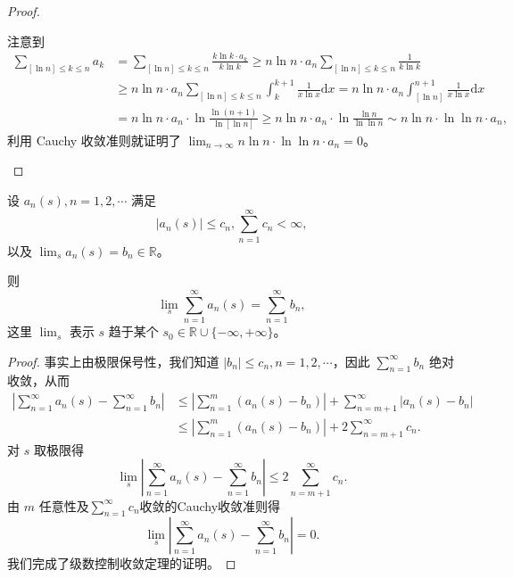 \documentclass[../../main.tex]{subfiles}
\begin{document}
\begin{proof}
\begin{enumerate}
注意到
\begin{align*}
\sum_{[\ln n] \leqslant k \leqslant n} a_k &= \sum_{[\ln n] \leqslant k \leqslant n} \frac{k \ln k \cdot a_k}{k \ln k} \geqslant n \ln n \cdot a_n \sum_{[\ln n] \leqslant k \leqslant n} \frac{1}{k \ln k} \\
&\geqslant n \ln n \cdot a_n \sum_{[\ln n] \leqslant k \leqslant n} \int_{k}^{k + 1} \frac{1}{x \ln x} \mathrm{d}x = n \ln n \cdot a_n \int_{[\ln n]}^{n + 1} \frac{1}{x \ln x} \mathrm{d}x \\
&= n \ln n \cdot a_n \cdot \ln \frac{\ln (n + 1)}{\ln [\ln n]} \geqslant n \ln n \cdot a_n \cdot \ln \frac{\ln n}{\ln \ln n} \sim n \ln n \cdot \ln \ln n \cdot a_n,
\end{align*}
利用 Cauchy 收敛准则就证明了 \( \lim_{n \to \infty} n \ln n \cdot \ln \ln n \cdot a_n = 0 \)。
\end{enumerate}
\end{proof}

\begin{theorem}[级数的控制收敛定理]\label{theorem:级数的控制收敛定理}
设 \( a_n(s), n = 1, 2, \cdots \) 满足
\[
|a_n(s)| \leqslant c_n, \sum_{n = 1}^{\infty} c_n < \infty,
\]
以及 \( \lim_{s} a_n(s) = b_n \in \mathbb{R} \)。

则
\[
\lim_{s} \sum_{n = 1}^{\infty} a_n(s) = \sum_{n = 1}^{\infty} b_n,
\]
这里 \( \lim_{s} \) 表示 \( s \) 趋于某个 \( s_0 \in \mathbb{R} \cup \{-\infty, +\infty\} \)。
\end{theorem}
\begin{proof}
事实上由极限保号性，我们知道 \( |b_n| \leqslant c_n, n = 1, 2, \cdots \)，因此 \( \sum_{n = 1}^{\infty} b_n \) 绝对收敛，从而
\begin{align*}
\left| \sum_{n = 1}^{\infty} a_n(s) - \sum_{n = 1}^{\infty} b_n \right| &\leqslant \left| \sum_{n = 1}^{m} (a_n(s) - b_n) \right| + \sum_{n = m + 1}^{\infty} |a_n(s) - b_n| \\
&\leqslant \left| \sum_{n = 1}^{m} (a_n(s) - b_n) \right| + 2 \sum_{n = m + 1}^{\infty} c_n.
\end{align*}
对 \( s \) 取极限得
\[
\lim_{s} \left| \sum_{n = 1}^{\infty} a_n(s) - \sum_{n = 1}^{\infty} b_n \right| \leqslant 2 \sum_{n = m + 1}^{\infty} c_n.
\]
由 \( m \) 任意性及$\sum_{n=1}^{\infty}{c_n}$收敛的Cauchy收敛准则得
\[
\lim_{s} \left| \sum_{n = 1}^{\infty} a_n(s) - \sum_{n = 1}^{\infty} b_n \right| = 0.
\]
我们完成了级数控制收敛定理的证明。
\end{proof}
\end{document}
